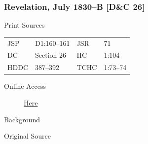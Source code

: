 		\subsubsection{Revelation, July 1830--B [D\&C 26]}
			\label{EMS-1830-JS-JUL-1830-B}
		
			\begin{description}
				\item[Print Sources]
			\end{description}

				\begin{tabular}{p{0.5in}p{1in}p{0.5in}p{1in}}
				JSP	 	& D1:160--161	& JSR 		& 71	 \\
				DC	 	& Section 26	& HC 		& 1:104	 \\
				HDDC 	& 387--392		& TCHC 		& 1:73--74 \\
				\end{tabular}
			
			\begin{description}
				\item[Online Access] \href{https://www.josephsmithpapers.org/paper-summary/revelation-july-1830-b-dc-26/1}{Here}
			\end{description}
			
			\begin{description}
				\item[Background]
			\end{description}
			
			
			\begin{description}
				\item[Original Source]
			\end{description}
			
			
